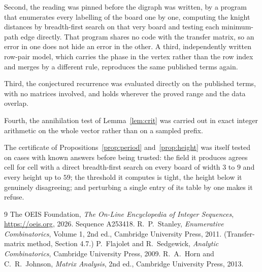 \documentclass[11pt,a4paper]{article}
\theoremstyle{plain}
\theoremstyle{definition}
\begin{document}
Second, the reading was pinned before the digraph was written, by a program that enumerates
every labelling of the board one by one, computing the knight distances by breadth-first
search on that very board and testing each minimum-path edge directly. That program shares no
code with the transfer matrix, so an error in one does not hide an error in the other. A
third, independently written row-pair model, which carries the phase in the vertex rather than
the row index and merges by a different rule, reproduces the same published terms again.

Third, the conjectured recurrence was evaluated directly on the published terms, with no
matrices involved, and holds wherever the proved range and the data overlap.

Fourth, the annihilation test of Lemma~\ref{lem:crit} was carried out in exact integer
arithmetic on the whole vector rather than on a sampled prefix.

The certificate of Propositions~\ref{prop:period} and~\ref{prop:height} was itself tested
on cases with known answers before being trusted: the field it produces agrees cell for cell
with a direct breadth-first search on every board of width $3$ to $9$ and every height up to
$59$; the threshold it computes is tight, the height below it genuinely disagreeing; and
perturbing a single entry of its table by one makes it refuse.

\begin{thebibliography}{9}
 The OEIS Foundation, \emph{The On-Line Encyclopedia of Integer
Sequences}, \url{https://oeis.org}, 2026. Sequence A253418.
 R.~P.~Stanley, \emph{Enumerative Combinatorics}, Volume 1, 2nd ed.,
Cambridge University Press, 2011. (Transfer-matrix method, Section 4.7.)
 P.~Flajolet and R.~Sedgewick, \emph{Analytic Combinatorics}, Cambridge
University Press, 2009.
 R.~A.~Horn and C.~R.~Johnson, \emph{Matrix Analysis}, 2nd ed., Cambridge
University Press, 2013.
\end{thebibliography}
\end{document}
